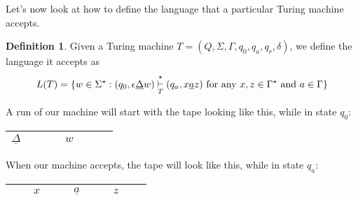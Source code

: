 \documentclass[]{article}
\DeclarePairedDelimiter{\set}{\lbrace}{\rbrace}
\theoremstyle{definition}
\newtheorem*{defn}{Definition}
\begin{document}
    Let's now look at how to define the language that a particular Turing machine accepts.
    \begin{defn}
      Given a Turing machine $T = (Q, \Sigma, \Gamma, q_0, q_a, q_r, \delta)$, we define the language it accepts as
      $$
        L(T) = \set{w \in \Sigma^\star : (q_0, \epsilon \underline{\Delta}w) \underset{T}{\overset{\star}{\vdash}} (q_a, x\underline{a}z) \text{ for any } x, z \in \Gamma^\star \text{ and } a \in \Gamma }
      $$
    \end{defn}

    A run of our machine will start with the tape looking like this, while in state $q_0$:
    \begin{center}
      \begin{tabular}{|c|ccccccc|}
        \hline
        $\underline{\Delta}$ & & & & $w$ & & & \\ \hline
      \end{tabular}
    \end{center}

    When our machine accepts, the tape will look like this, while in state $q_a$:
    \begin{center}
      \begin{tabular}{|ccccc|c|ccccc|}
        \hline
        & & $x$ & & & $\underline{a}$ & & & $z$ & & \\ \hline
      \end{tabular}
    \end{center}
\end{document}
